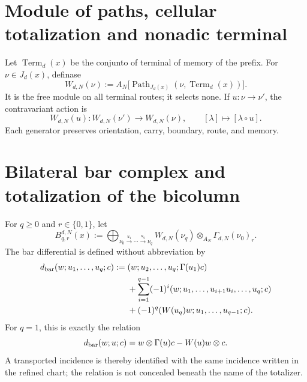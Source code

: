 \fi
\section{Module of paths, cellular totalization and nonadic terminal}
\label{sec:pdfv2-coh-route-module}

Let \(\operatorname{Term}_d(x)\) be the conjunto of terminal of memory of the
prefix. For \(\nu\in J_d(x)\), definase
\begin{equation}\label{eq:pdfv2-coh-w-module}
 W_{d,N}(\nu):=
 A_N\bigl[
 \operatorname{Path}_{J_d(x)}(\nu,\operatorname{Term}_d(x))
 \bigr].
\end{equation}
It is the free module on all terminal routes; it selects none. If
\(u:\nu\to\nu'\), the contravariant action is
\begin{equation}\label{eq:pdfv2-coh-w-action}
 W_{d,N}(u):W_{d,N}(\nu')\longrightarrow W_{d,N}(\nu),
 \qquad
 [\lambda]\longmapsto[\lambda\circ u].
\end{equation}
Each generator preserves orientation, carry, boundary, route, and memory.

\section{Bilateral bar complex and totalization of the bicolumn}
\label{sec:pdfv2-coh-bar}

For \(q\geq0\) and \(r\in\{0,1\}\), let
\begin{equation}\label{eq:pdfv2-coh-bar-bigraded}
 B_{q,r}^{d,N}(x):=
 \bigoplus_{\nu_0\xrightarrow{u_1}\cdots\xrightarrow{u_q}\nu_q}
 W_{d,N}(\nu_q)\otimes_{A_N}\Gamma_{d,N}(\nu_0)_r.
\end{equation}
The bar differential is defined without abbreviation by
\begin{align}
 d_{\rm bar}(w;u_1,\ldots,u_q;c)
 :={}&(w;u_2,\ldots,u_q;\Gamma(u_1)c)
 \nonumber\\
 &+\sum_{i=1}^{q-1}(-1)^i
 (w;u_1,\ldots,u_{i+1}u_i,\ldots,u_q;c)
 \nonumber\\
 &+(-1)^q
 (W(u_q)w;u_1,\ldots,u_{q-1};c).
 \label{eq:pdfv2-coh-bar-differential}
\end{align}
For \(q=1\), this is exactly the relation
\begin{equation}\label{eq:pdfv2-coh-coend-relation}
 d_{\rm bar}(w;u;c)
 =w\otimes\Gamma(u)c-W(u)w\otimes c.
\end{equation}
A transported incidence is thereby identified with the same incidence written
in the refined chart; the relation is not concealed beneath the name of the
totalizer.

